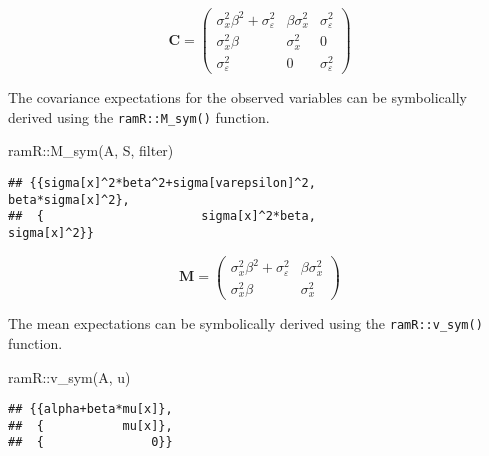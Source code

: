 \documentclass[
]{book}
\newenvironment{Shaded}{\begin{snugshade}}{\end{snugshade}}
\newcommand{\FunctionTok}[1]{\textcolor[rgb]{0.00,0.00,0.00}{#1}}
\newcommand{\NormalTok}[1]{#1}
\newcommand{\SpecialCharTok}[1]{\textcolor[rgb]{0.00,0.00,0.00}{#1}}
\theoremstyle{definition}
\theoremstyle{definition}
\theoremstyle{definition}
\theoremstyle{remark}
\begin{document}
\begin{equation*}\mathbf{C} =\left( \begin{array}{ccc} \sigma  _{x} ^{2} \beta  ^{2} + \sigma  _{\varepsilon } ^{2} & \beta  \sigma  _{x} ^{2} & \sigma  _{\varepsilon } ^{2} \\ \sigma  _{x} ^{2} \beta  & \sigma  _{x} ^{2} & 0 \\ \sigma  _{\varepsilon } ^{2} & 0 & \sigma  _{\varepsilon } ^{2} \end{array} \right)\end{equation*}

The covariance expectations for the observed variables
can be symbolically derived using the \texttt{ramR::M\_sym()} function.

\begin{Shaded}
\begin{Highlighting}[]
\NormalTok{ramR}\SpecialCharTok{::}\FunctionTok{M\_sym}\NormalTok{(A, S, filter)}
\end{Highlighting}
\end{Shaded}

\begin{verbatim}
## {{sigma[x]^2*beta^2+sigma[varepsilon]^2,                       beta*sigma[x]^2},
##  {                      sigma[x]^2*beta,                            sigma[x]^2}}
\end{verbatim}

\begin{equation*}\mathbf{M} =\left( \begin{array}{cc} \sigma  _{x} ^{2} \beta  ^{2} + \sigma  _{\varepsilon } ^{2} & \beta  \sigma  _{x} ^{2} \\ \sigma  _{x} ^{2} \beta  & \sigma  _{x} ^{2} \end{array} \right)\end{equation*}

The mean expectations
can be symbolically derived using the \texttt{ramR::v\_sym()} function.

\begin{Shaded}
\begin{Highlighting}[]
\NormalTok{ramR}\SpecialCharTok{::}\FunctionTok{v\_sym}\NormalTok{(A, u)}
\end{Highlighting}
\end{Shaded}

\begin{verbatim}
## {{alpha+beta*mu[x]},
##  {           mu[x]},
##  {               0}}
\end{verbatim}
\end{document}
